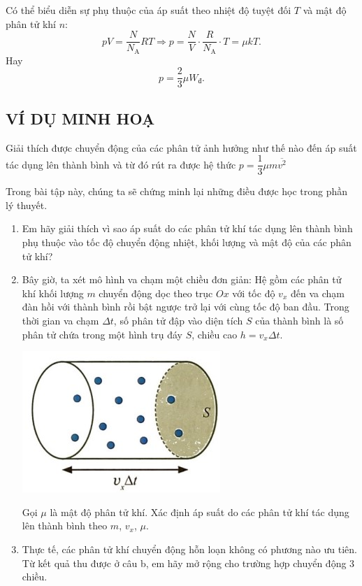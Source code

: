 \begin{boxkn}
	Có thể biểu diễn sự phụ thuộc của áp suất theo nhiệt độ tuyệt đối $T$ và mật độ phân tử khí $n$:
	$$pV=\dfrac{N}{N_\text{A}}RT\Rightarrow p=\dfrac{N}{V}\cdot\dfrac{R}{N_\text{A}}\cdot T=\mu kT.$$
	Hay
	$$p=\dfrac{2}{3}\mu W_\text{đ}.$$
\end{boxkn}
\subsection{VÍ DỤ MINH HOẠ}
\begin{dang}{Giải thích được chuyển động của các phân tử ảnh hưởng như thế nào đến áp suất tác dụng lên thành bình và từ đó rút ra được hệ thức $p=\dfrac{1}{3}\mu m\overline{v^2}$}
	\end{dang}
\begin{vd}
	Trong bài tập này, chúng ta sẽ chứng minh lại những điều được học trong phần lý thuyết.
		\begin{enumerate}[label=\alph*)]
			\item Em hãy giải thích vì sao áp suất do các phân tử khí tác dụng lên thành bình phụ thuộc vào tốc độ chuyển động nhiệt, khối lượng và mật độ của các phân tử khí?
			\item Bây giờ, ta xét mô hình va chạm một chiều đơn giản: Hệ gồm các phân tử khí khối lượng $m$ chuyển động dọc theo trục $Ox$ với tốc độ $v_x$ đến va chạm đàn hồi với thành bình rồi bật ngược trở lại với cùng tốc độ ban đầu. Trong thời gian va chạm $\Delta t$, số phân tử đập vào diện tích $S$ của thành bình là số phân tử chứa trong một hình trụ đáy $S$, chiều cao $h=v_x\Delta t$. 
			\begin{center}
				\includegraphics[width=0.3\linewidth]{figs/VN12-Y24-PH-SYL-014-1}
			\end{center}
			Gọi $\mu$ là mật độ phân tử khí. Xác định áp suất do các phân tử khí tác dụng lên thành bình theo $m$, $v_x$, $\mu$.
			\item Thực tế, các phân tử khí chuyển động hỗn loạn không có phương nào ưu tiên. Từ kết quả thu được ở câu b, em hãy mở rộng cho trường hợp chuyển động 3 chiều.
		\end{enumerate}

\end{vd}
